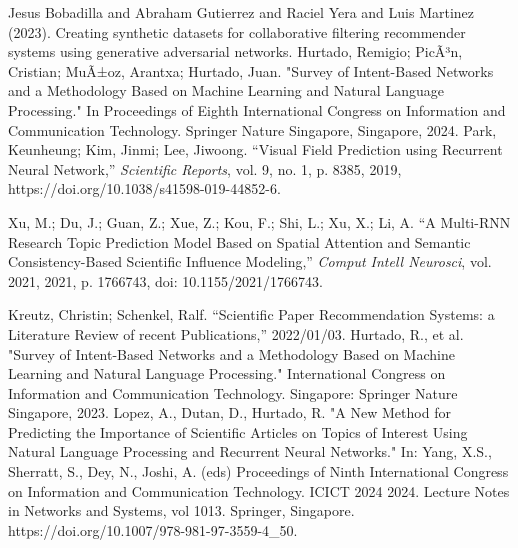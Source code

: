 \documentclass[runningheads]{llncs}
\begin{document}
\begin{thebibliography}{00}
     Jesus Bobadilla and Abraham Gutierrez and Raciel Yera and Luis Martinez (2023). Creating synthetic datasets for collaborative filtering recommender systems using generative adversarial networks.
    Hurtado, Remigio; PicÃ³n, Cristian; MuÃ±oz, Arantxa; Hurtado, Juan.
    "Survey of Intent-Based Networks and a Methodology Based on Machine Learning and Natural Language Processing."
    In Proceedings of Eighth International Congress on Information and Communication Technology.
    Springer Nature Singapore, Singapore, 2024.
    Park, Keunheung; Kim, Jinmi; Lee, Jiwoong. 
    ``Visual Field Prediction using Recurrent Neural Network,'' 
    \emph{Scientific Reports}, 
    vol. 9, no. 1, p. 8385, 
    2019, 
    https://doi.org/10.1038/s41598-019-44852-6.
    
    Xu, M.; Du, J.; Guan, Z.; Xue, Z.; Kou, F.; Shi, L.; Xu, X.; Li, A. 
    ``A Multi-RNN Research Topic Prediction Model Based on Spatial Attention and Semantic Consistency-Based Scientific Influence Modeling,'' 
    \emph{Comput Intell Neurosci}, 
    vol. 2021, 
    2021, 
    p. 1766743, 
    doi: 10.1155/2021/1766743.
    
    Kreutz, Christin; Schenkel, Ralf.
    ``Scientific Paper Recommendation Systems: a Literature Review of recent Publications,''
    2022/01/03.
	 Hurtado, R., et al. "Survey of Intent-Based Networks and a Methodology Based on Machine Learning and Natural Language Processing." International Congress on Information and Communication Technology. Singapore: Springer Nature Singapore, 2023.
     Lopez, A., Dutan, D., Hurtado, R. "A New Method for Predicting the Importance of Scientific Articles on Topics of Interest Using Natural Language Processing and Recurrent Neural Networks." In: Yang, X.S., Sherratt, S., Dey, N., Joshi, A. (eds) Proceedings of Ninth International Congress on Information and Communication Technology. ICICT 2024 2024. Lecture Notes in Networks and Systems, vol 1013. Springer, Singapore. https://doi.org/10.1007/978-981-97-3559-4\_50.
\end{thebibliography}
\end{document}
